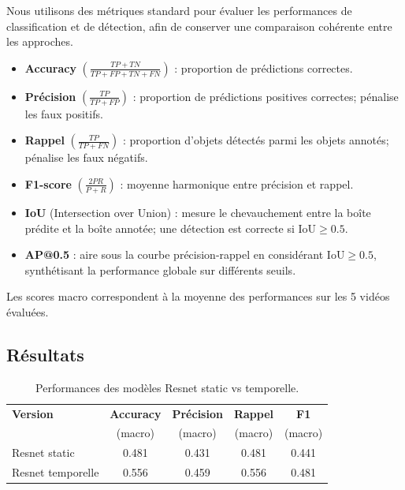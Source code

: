 \documentclass{article}
\begin{document}
Nous utilisons des métriques standard pour évaluer les performances de classification et de détection, afin de conserver une comparaison cohérente entre les approches.

\begin{itemize}
    \item \textbf{Accuracy} $\left(\frac{TP+TN}{TP+FP+TN+FN}\right)$ : proportion de prédictions correctes.

    \item \textbf{Précision} $\left(\frac{TP}{TP+FP}\right)$ : proportion de prédictions positives correctes; pénalise les faux positifs.

    \item \textbf{Rappel} $\left(\frac{TP}{TP+FN}\right)$ : proportion d’objets détectés parmi les objets annotés; pénalise les faux négatifs.

    \item \textbf{F1-score} $\left(\frac{2PR}{P+R}\right)$ : moyenne harmonique entre précision et rappel.

    \item \textbf{IoU} (Intersection over Union) : mesure le chevauchement entre la boîte prédite et la boîte annotée; une détection est correcte si $\text{IoU} \geq 0.5$.

    \item \textbf{AP@0.5} : aire sous la courbe précision-rappel en considérant $\text{IoU} \geq 0.5$, synthétisant la performance globale sur différents seuils.
\end{itemize}

Les scores macro correspondent à la moyenne des performances sur les 5 vidéos évaluées.


\subsection{Résultats}

\begin{table}[h]
\centering
\begin{tabular}{lcccc}
\hline
\textbf{Version} & \textbf{Accuracy} & \textbf{Précision} & \textbf{Rappel} & \textbf{F1} \\
& (macro) & (macro) & (macro)& (macro)\\
\hline
Resnet static & 0.481 & 0.431 & 0.481 & 0.441 \\
Resnet temporelle & 0.556 & 0.459 & 0.556 & 0.481 \\
\hline
\end{tabular}
\caption{Performances des modèles Resnet static vs temporelle.}
\end{table}
\end{document}
